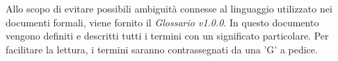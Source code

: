 Allo scopo di evitare possibili ambiguità connesse al linguaggio utilizzato nei documenti formali, 
viene fornito il \textit{Glossario v1.0.0}. In questo documento vengono definiti e descritti tutti i termini con un 
significato particolare. Per facilitare la lettura, i termini saranno contrassegnati da una ’G’ a pedice.